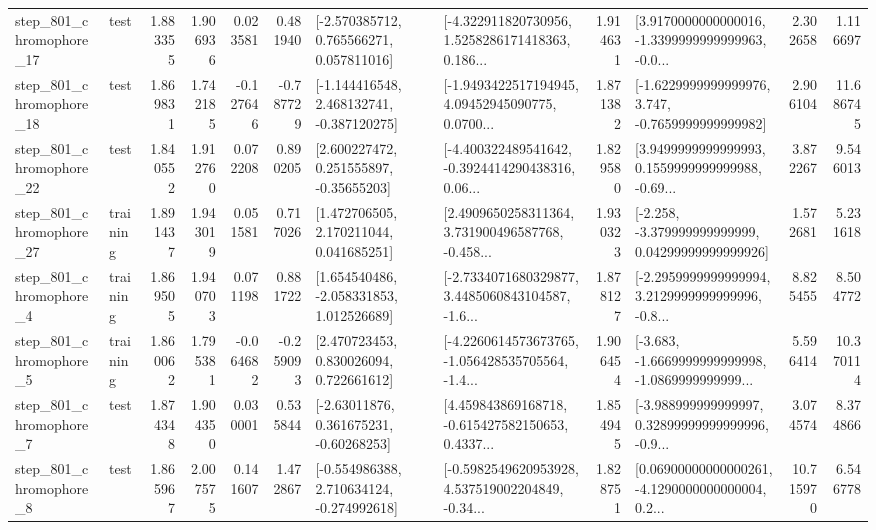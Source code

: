 \begin{tabular}{llrrrrllrlrr}
  step\_801\_chromophore\_17 &      test &      1.883355 &    1.906936 &      0.023581 &  0.481940 &    [-2.570385712, 0.765566271, 0.057811016] &  [-4.322911820730956, 1.5258286171418363, 0.186... &       1.914631 &  [3.9170000000000016, -1.3399999999999963, -0.0... &            2.302658 &          1.116697 \\
  step\_801\_chromophore\_18 &      test &      1.869831 &    1.742185 &     -0.127646 & -0.787729 &   [-1.144416548, 2.468132741, -0.387120275] &  [-1.9493422517194945, 4.09452945090775, 0.0700... &       1.871382 &  [-1.6229999999999976, 3.747, -0.7659999999999982] &            2.906104 &         11.686745 \\
  step\_801\_chromophore\_22 &      test &      1.840552 &    1.912760 &      0.072208 &  0.890205 &     [2.600227472, 0.251555897, -0.35655203] &  [-4.400322489541642, -0.3924414290438316, 0.06... &       1.829580 &  [3.9499999999999993, 0.1559999999999988, -0.69... &            3.872267 &          9.546013 \\
  step\_801\_chromophore\_27 &  training &      1.891437 &    1.943019 &      0.051581 &  0.717026 &     [1.472706505, 2.170211044, 0.041685251] &  [2.4909650258311364, 3.731900496587768, -0.458... &       1.930323 &  [-2.258, -3.379999999999999, 0.04299999999999926] &            1.572681 &          5.231618 \\
   step\_801\_chromophore\_4 &  training &      1.869505 &    1.940703 &      0.071198 &  0.881722 &    [1.654540486, -2.058331853, 1.012526689] &  [-2.7334071680329877, 3.4485060843104587, -1.6... &       1.878127 &  [-2.2959999999999994, 3.2129999999999996, -0.8... &            8.825455 &          8.504772 \\
   step\_801\_chromophore\_5 &  training &      1.860062 &    1.795381 &     -0.064682 & -0.259093 &     [2.470723453, 0.830026094, 0.722661612] &  [-4.2260614573673765, -1.056428535705564, -1.4... &       1.906454 &  [-3.683, -1.6669999999999998, -1.0869999999999... &            5.596414 &         10.370114 \\
   step\_801\_chromophore\_7 &      test &      1.874348 &    1.904350 &      0.030001 &  0.535844 &     [-2.63011876, 0.361675231, -0.60268253] &  [4.459843869168718, -0.615427582150653, 0.4337... &       1.854945 &  [-3.988999999999997, 0.32899999999999996, -0.9... &            3.074574 &          8.374866 \\
   step\_801\_chromophore\_8 &      test &      1.865967 &    2.007575 &      0.141607 &  1.472867 &   [-0.554986388, 2.710634124, -0.274992618] &  [-0.5982549620953928, 4.537519002204849, -0.34... &       1.828751 &  [0.06900000000000261, -4.1290000000000004, 0.2... &           10.715970 &          6.546778 \\

\end{tabular}
